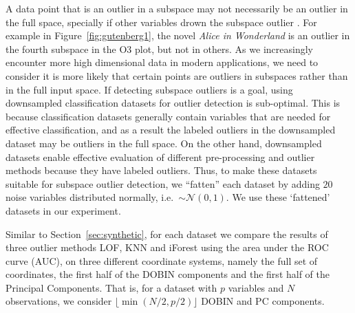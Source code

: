 \documentclass[a4paper,11pt]{article}
\begin{document}


A data point that is an outlier in a subspace may not necessarily be an outlier in the full space, specially if other variables drown the subspace outlier \citep{zimek2012survey}. For example in  Figure~\ref{fig:gutenberg1}, the novel \textit{Alice in Wonderland} is an outlier in the fourth subspace in the O3 plot, but not in others.  As we increasingly encounter more  high dimensional data in modern applications, we need to consider it is more likely that certain points are outliers in subspaces rather than in the full input space.  If detecting subspace outliers is a goal, using downsampled classification datasets for outlier detection is sub-optimal. This is because classification datasets generally contain variables that are needed for effective classification, and as a result the labeled outliers in the downsampled dataset may be outliers in the full space. On the other hand, downsampled datasets enable effective evaluation of different pre-processing and outlier methods because they have labeled outliers. Thus, to make these datasets suitable for subspace outlier detection, we ``fatten'' each dataset by adding $20$ noise variables distributed normally, i.e.\ $\sim \mathcal{N}(0,1)$. We use these `fattened' datasets in our experiment.

Similar to Section~\ref{sec:synthetic}, for each dataset we compare the results of three outlier methods LOF, KNN and iForest using the area under the ROC curve (AUC), on three different coordinate systems, namely the full set of coordinates, the first half of the DOBIN components and the first half of the Principal Components. That is, for a dataset with $p$ variables and $N$ observations,  we consider $\lfloor\min(N/2, p/2)\rfloor$ DOBIN and PC components.
\end{document}
